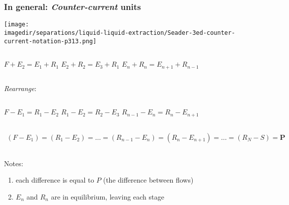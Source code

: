 \begin{frame}\frametitle{In general: \emph{Counter-current} units}
	\begin{center}
		\texttt{[image: \\imagedir/separations/liquid-liquid-extraction/Seader-3ed-counter-current-notation-p313.png]}
	\end{center}
		\begin{center}
			\begin{columns}[t]
					\small $F + E_2 = E_1 + R_1$
					\small $E_2 + R_2 = E_3 + R_1$
					\small $E_n + R_n = E_{n+1} + R_{n-1}$
			\end{columns}
		\end{center}
		\vspace{-12pt}
		\emph{Rearrange}:
		\begin{center}
			\begin{columns}[t]
					\small $F - E_1 = R_1 - E_2$
					\small $R_1 - E_2 = R_2 - E_3$
					\small $R_{n-1} - E_n = R_{n} - E_{n+1}$
			\end{columns}
		\end{center}
		\vspace{-12pt}
		\begin{columns}[t]
				{
				\small
				\[
				\begin{array}{c}
					(F - E_1)  =  (R_1 - E_2) = \ldots = (R_{n-1} - E_n) = (R_{n} - E_{n+1}) = \ldots = (R_N - S) = \mathbf{P}
				\end{array}
				\]}
		\end{columns}
		Notes:
		\begin{enumerate}
			\item	each difference is equal to $P$ (the difference between flows)
			\item	$E_n$ and $R_{n}$ are in equilibrium, leaving each stage {\color{myOrange}{[via tie line]}}
		\end{enumerate}
\end{frame}

